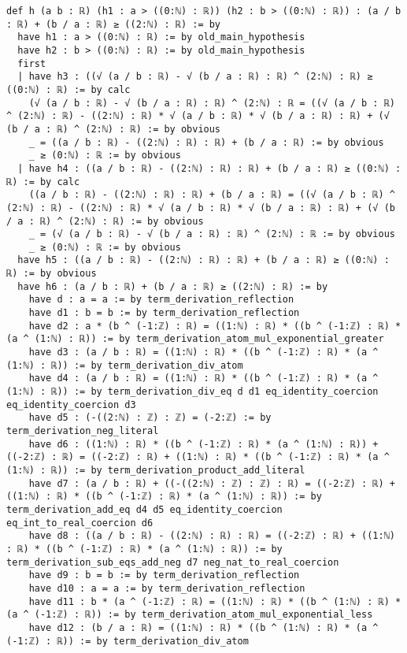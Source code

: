 \documentclass{article}
\begin{document}
\begin{tcolorbox}[colback=white!10, width=\linewidth]
\begin{lstlisting}[language=Lean4]
def h (a b : ℝ) (h1 : a > ((0:ℕ) : ℝ)) (h2 : b > ((0:ℕ) : ℝ)) : (a / b : ℝ) + (b / a : ℝ) ≥ ((2:ℕ) : ℝ) := by
  have h1 : a > ((0:ℕ) : ℝ) := by old_main_hypothesis
  have h2 : b > ((0:ℕ) : ℝ) := by old_main_hypothesis
  first
  | have h3 : ((√ (a / b : ℝ) - √ (b / a : ℝ) : ℝ) ^ (2:ℕ) : ℝ) ≥ ((0:ℕ) : ℝ) := by calc
    (√ (a / b : ℝ) - √ (b / a : ℝ) : ℝ) ^ (2:ℕ) : ℝ = ((√ (a / b : ℝ) ^ (2:ℕ) : ℝ) - ((2:ℕ) : ℝ) * √ (a / b : ℝ) * √ (b / a : ℝ) : ℝ) + (√ (b / a : ℝ) ^ (2:ℕ) : ℝ) := by obvious
    _ = ((a / b : ℝ) - ((2:ℕ) : ℝ) : ℝ) + (b / a : ℝ) := by obvious
    _ ≥ (0:ℕ) : ℝ := by obvious
  | have h4 : ((a / b : ℝ) - ((2:ℕ) : ℝ) : ℝ) + (b / a : ℝ) ≥ ((0:ℕ) : ℝ) := by calc
    ((a / b : ℝ) - ((2:ℕ) : ℝ) : ℝ) + (b / a : ℝ) = ((√ (a / b : ℝ) ^ (2:ℕ) : ℝ) - ((2:ℕ) : ℝ) * √ (a / b : ℝ) * √ (b / a : ℝ) : ℝ) + (√ (b / a : ℝ) ^ (2:ℕ) : ℝ) := by obvious
    _ = (√ (a / b : ℝ) - √ (b / a : ℝ) : ℝ) ^ (2:ℕ) : ℝ := by obvious
    _ ≥ (0:ℕ) : ℝ := by obvious
  have h5 : ((a / b : ℝ) - ((2:ℕ) : ℝ) : ℝ) + (b / a : ℝ) ≥ ((0:ℕ) : ℝ) := by obvious
  have h6 : (a / b : ℝ) + (b / a : ℝ) ≥ ((2:ℕ) : ℝ) := by
    have d : a = a := by term_derivation_reflection
    have d1 : b = b := by term_derivation_reflection
    have d2 : a * (b ^ (-1:ℤ) : ℝ) = ((1:ℕ) : ℝ) * ((b ^ (-1:ℤ) : ℝ) * (a ^ (1:ℕ) : ℝ)) := by term_derivation_atom_mul_exponential_greater
    have d3 : (a / b : ℝ) = ((1:ℕ) : ℝ) * ((b ^ (-1:ℤ) : ℝ) * (a ^ (1:ℕ) : ℝ)) := by term_derivation_div_atom
    have d4 : (a / b : ℝ) = ((1:ℕ) : ℝ) * ((b ^ (-1:ℤ) : ℝ) * (a ^ (1:ℕ) : ℝ)) := by term_derivation_div_eq d d1 eq_identity_coercion eq_identity_coercion d3
    have d5 : (-((2:ℕ) : ℤ) : ℤ) = (-2:ℤ) := by term_derivation_neg_literal
    have d6 : ((1:ℕ) : ℝ) * ((b ^ (-1:ℤ) : ℝ) * (a ^ (1:ℕ) : ℝ)) + ((-2:ℤ) : ℝ) = ((-2:ℤ) : ℝ) + ((1:ℕ) : ℝ) * ((b ^ (-1:ℤ) : ℝ) * (a ^ (1:ℕ) : ℝ)) := by term_derivation_product_add_literal
    have d7 : (a / b : ℝ) + ((-((2:ℕ) : ℤ) : ℤ) : ℝ) = ((-2:ℤ) : ℝ) + ((1:ℕ) : ℝ) * ((b ^ (-1:ℤ) : ℝ) * (a ^ (1:ℕ) : ℝ)) := by term_derivation_add_eq d4 d5 eq_identity_coercion eq_int_to_real_coercion d6
    have d8 : ((a / b : ℝ) - ((2:ℕ) : ℝ) : ℝ) = ((-2:ℤ) : ℝ) + ((1:ℕ) : ℝ) * ((b ^ (-1:ℤ) : ℝ) * (a ^ (1:ℕ) : ℝ)) := by term_derivation_sub_eqs_add_neg d7 neg_nat_to_real_coercion
    have d9 : b = b := by term_derivation_reflection
    have d10 : a = a := by term_derivation_reflection
    have d11 : b * (a ^ (-1:ℤ) : ℝ) = ((1:ℕ) : ℝ) * ((b ^ (1:ℕ) : ℝ) * (a ^ (-1:ℤ) : ℝ)) := by term_derivation_atom_mul_exponential_less
    have d12 : (b / a : ℝ) = ((1:ℕ) : ℝ) * ((b ^ (1:ℕ) : ℝ) * (a ^ (-1:ℤ) : ℝ)) := by term_derivation_div_atom

\end{lstlisting}
\end{tcolorbox}
\end{document}
